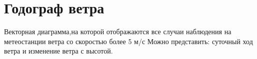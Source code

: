 
\section{Годограф ветра}
Векторная диаграмма,на которой отображаются все случаи наблюдения на метеостанции ветра со скоростью более 5 м/с Можно представить: суточный ход ветра и изменение ветра с высотой.